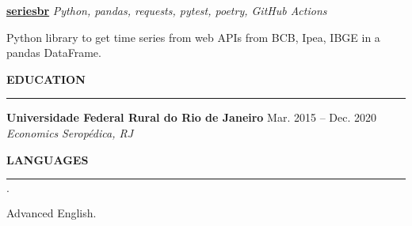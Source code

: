 \documentclass[11pt,letterpaper]{article}
\newenvironment{tightlist}
  {\begin{list}
    {$\cdot$}
    {
      \setlength{\leftmargin}{0em}
      \setlength{\itemsep}{-\smallskipamount}
    }
  }
{\end{list}}
\begin{document}
\smallskip

\textbf{\href{https://github.com/phelipetls/seriesbr}{seriesbr}} \hfill \emph{Python, pandas, requests, pytest, poetry, GitHub Actions}
{\parfillskip=0pt\par}
Python library to get time series from web APIs from BCB, Ipea, IBGE in a pandas DataFrame.

\medskip \textbf{EDUCATION} \medskip
\hrule

\textbf{Universidade Federal Rural do Rio de Janeiro} \hfill {Mar. 2015 -- Dec. 2020} \\
\emph{Economics} \hfill \emph{Seropédica, RJ} {\parfillskip=0pt\par}

\medskip \textbf{LANGUAGES} \medskip
\hrule

\begin{tightlist}
  \item Advanced English.
\end{tightlist}
\end{document}
